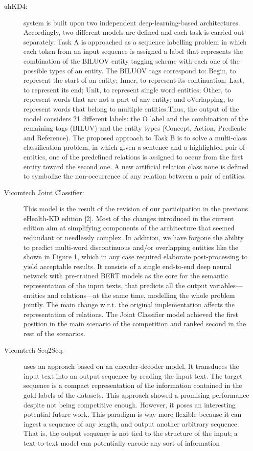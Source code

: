 \documentclass[a4paper,11pt,twocolumn,twoside]{article}
\begin{document}
\begin{description}
  \item[uhKD4:]  system is built upon two independent deep-learning-based architectures. Accordingly, two
  different models are defined and each task is carried out separately. Task A is approached as a
  sequence labelling problem in which each token from an input sequence is assigned a label that
  represents the combination of the BILUOV entity tagging scheme with each one of the possible
  types of an entity. The BILUOV tags correspond to: Begin, to represent the start of an entity;
  Inner, to represent its continuation; Last, to represent its end; Unit, to represent single word
  entities; Other, to represent words that are not a part of any entity; and oVerlapping, to represent
  words that belong to multiple entities.Thus, the output of the model considers 21 different labels: the
  O label and the combination of the remaining tags (BILUV) and the entity types (Concept,
  Action, Predicate and Reference). The proposed approach to Task B is to solve a multi-class
  classification problem, in which given a sentence and a highlighted pair of entities, one of the
  predefined relations is assigned to occur from the first entity toward the second one. A new
  artificial relation class none is defined to symbolize the non-occurrence of any relation between
  a pair of entities.

  \item[Vicomtech Joint Classifier:] This model is the result of the revision of our participation in the previous eHealth-KD edition
  [2]. Most of the changes introduced in the current edition aim at simplifying components of
  the architecture that seemed redundant or needlessly complex. In addition, we have forgone
  the ability to predict multi-word discontinuous and/or overlapping entities like the shown in
  Figure 1, which in any case required elaborate post-processing to yield acceptable results.
  It consists of a single end-to-end deep neural network with
  pre-trained BERT models as the core for the semantic representation of the input texts, that predicts all
  the output variables—entities and relations—at the same time, modelling the whole problem jointly.
  The main change w.r.t. the original implementation affects the representation of relations. The Joint
  Classifier model achieved the first position in the main scenario of the competition and ranked second
  in the rest of the scenarios.

  \item[Vicomtech  Seq2Seq:] uses an approach based on an
  encoder-decoder model. It transduces the input text into an output sequence by reading the input text.
  The target sequence is a compact representation of the information contained in the gold-labels of
  the datasets. This approach showed a promising performance despite not being competitive enough.
  However, it poses an interesting potential future work.
  This paradigm is way more flexible because it can ingest a sequence of any length,
  and output another arbitrary sequence. That is, the output sequence is not tied to the structure
  of the input; a text-to-text model can potentially encode any sort of information
 

\end{description}
\end{document}
